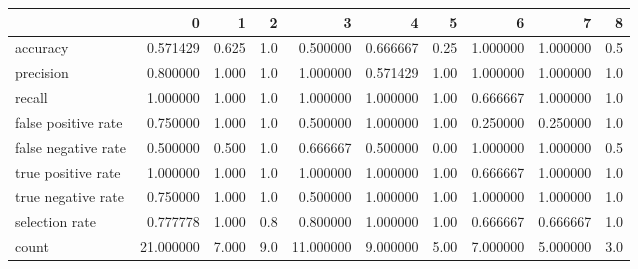\begin{tabular}{lrrrrrrrrr}
\toprule
{} &          0 &      1 &    2 &          3 &         4 &     5 &         6 &         7 &    8 \\
\midrule
accuracy            &   0.571429 &  0.625 &  1.0 &   0.500000 &  0.666667 &  0.25 &  1.000000 &  1.000000 &  0.5 \\
precision           &   0.800000 &  1.000 &  1.0 &   1.000000 &  0.571429 &  1.00 &  1.000000 &  1.000000 &  1.0 \\
recall              &   1.000000 &  1.000 &  1.0 &   1.000000 &  1.000000 &  1.00 &  0.666667 &  1.000000 &  1.0 \\
false positive rate &   0.750000 &  1.000 &  1.0 &   0.500000 &  1.000000 &  1.00 &  0.250000 &  0.250000 &  1.0 \\
false negative rate &   0.500000 &  0.500 &  1.0 &   0.666667 &  0.500000 &  0.00 &  1.000000 &  1.000000 &  0.5 \\
true positive rate  &   1.000000 &  1.000 &  1.0 &   1.000000 &  1.000000 &  1.00 &  0.666667 &  1.000000 &  1.0 \\
true negative rate  &   0.750000 &  1.000 &  1.0 &   0.500000 &  1.000000 &  1.00 &  1.000000 &  1.000000 &  1.0 \\
selection rate      &   0.777778 &  1.000 &  0.8 &   0.800000 &  1.000000 &  1.00 &  0.666667 &  0.666667 &  1.0 \\
count               &  21.000000 &  7.000 &  9.0 &  11.000000 &  9.000000 &  5.00 &  7.000000 &  5.000000 &  3.0 \\
\bottomrule
\end{tabular}

